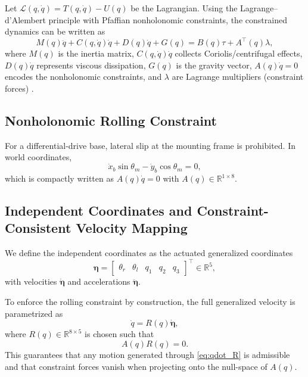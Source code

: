 \documentclass[conference]{IEEEtran}
\newcommand{\etav}{\bm{\eta}}
\begin{document}
Let $\mathcal{L}(q,\dot q)=T(q,\dot q)-U(q)$ be the Lagrangian. Using the Lagrange--d'Alembert principle with Pfaffian nonholonomic constraints, the constrained dynamics can be written as
\begin{equation}
M(q)\ddot q + C(q,\dot q)\dot q + D(q)\dot q + G(q)
=
B(q)\tau + A^\top(q)\lambda,
\label{eq:full_constrained_dyn}
\end{equation}
where $M(q)$ is the inertia matrix, $C(q,\dot q)\dot q$ collects Coriolis/centrifugal effects, $D(q)\dot q$ represents viscous dissipation, $G(q)$ is the gravity vector, $A(q)\dot q = 0$ encodes the nonholonomic constraints, and $\lambda$ are Lagrange multipliers (constraint forces) \cite{blochControlStabilizationNonholonomic1992}.

\subsection{Nonholonomic Rolling Constraint}
\label{subsec:nh_constraint}

For a differential-drive base, lateral slip at the mounting frame is prohibited. In world coordinates,
\begin{equation}
\dot{x}_b \sin\theta_m - \dot{y}_b \cos\theta_m = 0,
\label{eq:nonholonomic}
\end{equation}
which is compactly written as $A(q)\dot q = 0$ with $A(q)\in\mathbb{R}^{1\times 8}$.

\subsection{Independent Coordinates and Constraint-Consistent Velocity Mapping}
\label{subsec:eta_R}

We define the independent coordinates as the actuated generalized coordinates
\begin{equation}
\etav =
\begin{bmatrix}
\theta_r & \theta_l & q_1 & q_2 & q_3
\end{bmatrix}^{\!\top}\in\mathbb{R}^{5},
\label{eq:eta_def}
\end{equation}
with velocities $\dot{\etav}$ and accelerations $\ddot{\etav}$.

To enforce the rolling constraint by construction, the full generalized velocity is parametrized as
\begin{equation}
\dot q = R(q)\dot{\etav},
\label{eq:qdot_R}
\end{equation}
where $R(q)\in\mathbb{R}^{8\times 5}$ is chosen such that
\begin{equation}
A(q)R(q)=0.
\label{eq:AR0}
\end{equation}
This guarantees that any motion generated through \eqref{eq:qdot_R} is admissible and that constraint forces vanish when projecting onto the null-space of $A(q)$.
\end{document}
